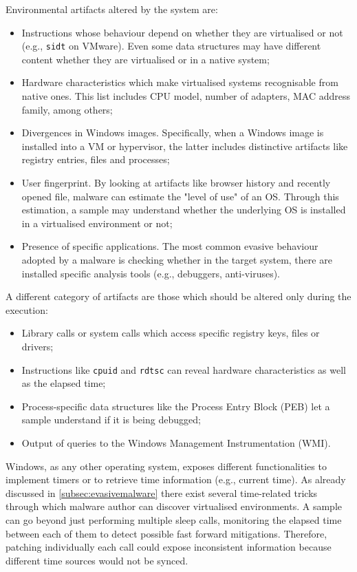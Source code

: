 \documentclass[LaM,binding=0.6cm]{sapthesis}
\begin{document}
\clearpage
\noindent
Environmental artifacts altered by the system are:
\begin{itemize}
\item Instructions whose behaviour depend on whether they are virtualised or not (e.g., \texttt{sidt} on VMware). Even some data structures may have different content whether they are virtualised or in a native system;
\item Hardware characteristics which make virtualised systems recognisable from native ones. This list includes CPU model, number of adapters, MAC address family, among others;
\item Divergences in Windows images. Specifically, when a Windows image is installed into a VM or hypervisor, the latter includes distinctive artifacts like registry entries, files and processes;
\item User fingerprint. By looking at artifacts like browser history and recently opened file, malware can estimate the "level of use" of an OS. Through this estimation, a sample may understand whether the underlying OS is installed in a virtualised environment or not;
\item Presence of specific applications. The most common evasive behaviour adopted by a malware is checking whether in the target system, there are installed specific analysis tools (e.g., debuggers, anti-viruses).
\end{itemize} 
A different category of artifacts are those which should be altered only during the execution:
\begin{itemize}
\item Library calls or system calls which access specific registry keys, files or drivers;
\item Instructions like \texttt{cpuid} and \texttt{rdtsc} can reveal hardware characteristics as well as the elapsed time;
\item Process-specific data structures like the Process Entry Block (PEB) let a sample understand if it is being debugged;
\item Output of queries to the Windows Management Instrumentation (WMI).
\end{itemize}
Windows, as any other operating system, exposes different functionalities to implement timers or to retrieve time information (e.g., current time). As already discussed in \autoref{subsec:evasivemalware} there exist several time-related tricks through which malware author can discover virtualised environments. A sample can go beyond just performing multiple sleep calls, monitoring the elapsed time between each of them to detect possible fast forward mitigations. Therefore, patching individually each call could expose inconsistent information because different time sources would not be synced.
\end{document}
